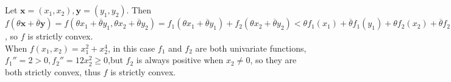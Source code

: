 \documentclass[12pt,letterpaper]{article}
\begin{document}
\section{}
Let $\boldsymbol{x}=(x_1,x_2),\boldsymbol{y}=(y_1,y_2)$. Then $f(\theta\boldsymbol{x}+\overline{\theta}\boldsymbol{y})=f(\theta x_1+\overline{\theta}y_1,\theta x_2+\overline{\theta}y_2)=f_1(\theta x_1+\overline{\theta}y_1)+f_2(\theta x_2+\overline{\theta}y_2)<\theta f_1(x_1)+\overline{\theta}f_1(y_1)+\theta f_2(x_2)+\overline{\theta}f_2(y_2)=\theta f(\boldsymbol{x})+\overline{\theta}f(\boldsymbol{y})$, so $f$ is strictly convex.\\
When $f(x_1,x_2)=x_1^2+x_2^4$, in this case $f_1$ and $f_2$ are both univariate functions, $f_1''=2>0,f_2''=12x_2^2\geq0$,but $f_2$ is always positive when $x_2\neq0$, so they are both strictly convex, thus $f$ is strictly convex. 
\end{document}
